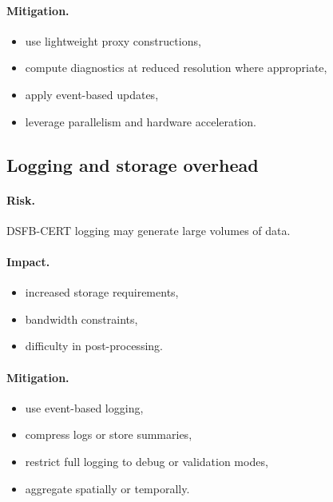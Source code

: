 \documentclass[11pt,letterpaper]{article}
\theoremstyle{gcresult}
\theoremstyle{definition}
\begin{document}
\paragraph{Mitigation.}
\begin{itemize}[leftmargin=1.5em]
    \item use lightweight proxy constructions,
    \item compute diagnostics at reduced resolution where appropriate,
    \item apply event-based updates,
    \item leverage parallelism and hardware acceleration.
\end{itemize}


\subsection{Logging and storage overhead}

\paragraph{Risk.}
DSFB-CERT logging may generate large volumes of data.

\paragraph{Impact.}
\begin{itemize}[leftmargin=1.5em]
    \item increased storage requirements,
    \item bandwidth constraints,
    \item difficulty in post-processing.
\end{itemize}

\paragraph{Mitigation.}
\begin{itemize}[leftmargin=1.5em]
    \item use event-based logging,
    \item compress logs or store summaries,
    \item restrict full logging to debug or validation modes,
    \item aggregate spatially or temporally.
\end{itemize}
\end{document}
